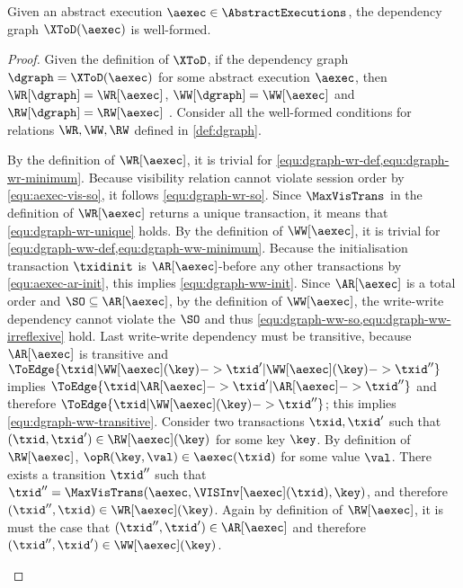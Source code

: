 \begin{toappendix}
\label{sec:proof-well-form-xtod}
\begin{proposition}
\label{prop:well-defined-xtod}
Given an abstract execution \( \aexec \in \AbstractExecutions \),
the dependency graph \( \XToD(\aexec)\) is well-formed.
\end{proposition}
\begin{proof}
Given the definition of \( \XToD \), if the dependency graph \( \dgraph = \XToD(\aexec)\) 
for some abstract execution \( \aexec \), then \( \WR[\dgraph] = \WR[\aexec] \),
\( \WW[\dgraph] = \WW[\aexec] \) and  \( \RW[\dgraph] = \RW[\aexec]\)  .
Consider all the well-formed conditions for relations \( \WR,\WW,\RW \) defined in \cref{def:dgraph}.
\begin{enumerate}
    By the definition of \( \WR[\aexec] \), it is trivial for \cref{equ:dgraph-wr-def,equ:dgraph-wr-minimum}.
    Because visibility relation cannot violate session order by \cref{equ:aexec-vis-so},
    it follows \cref{equ:dgraph-wr-so}.
    Since \(\MaxVisTrans \) in the definition of \( \WR[\aexec] \) returns a unique transaction, it means that \cref{equ:dgraph-wr-unique} holds.
    By the definition of \( \WW[\aexec] \), it is trivial for \cref{equ:dgraph-ww-def,equ:dgraph-ww-minimum}.
    Because the initialisation transaction \( \txidinit \)
    is \( \AR[\aexec]\)-before any other transactions by  \cref{equ:aexec-ar-init}, 
    this implies \cref{equ:dgraph-ww-init}.
    Since \(\AR[\aexec] \) is a total order and \( \SO \subseteq \AR[\aexec] \), 
    by the definition of \( \WW[\aexec]\), the write-write dependency cannot violate the \( \SO \) 
    and thus \cref{equ:dgraph-ww-so,equ:dgraph-ww-irreflexive} hold.
    Last write-write dependency must be transitive,
    because \( \AR[\aexec] \) is transitive and 
    \( \ToEdge{\txid | \WW[\aexec](\key) -> \txid' | \WW[\aexec](\key) -> \txid'' }\) implies
    \( \ToEdge{\txid | \AR[\aexec] -> \txid' | \AR[\aexec] -> \txid'' }\) and therefore
    \( \ToEdge{\txid | \WW[\aexec](\key) -> \txid'' }\);
    this implies \cref{equ:dgraph-ww-transitive}.
    Consider two transactions \( \txid, \txid'\) such that \( (\txid,\txid') \in \RW[\aexec](\key) \)
    for some key \( \key \).
    By definition of \( \RW[\aexec] \), \( \opR(\key,\val) \in \aexec(\txid )\) for some value \( \val \).
    There exists a transition \( \txid'' \) such that \( \txid'' = \MaxVisTrans(\aexec,\VISInv[\aexec](\txid),\key) \),
    and therefore \( (\txid'',\txid) \in \WR[\aexec](\key)\).
    Again by definition of \( \RW[\aexec] \), it is must the case that \( (\txid'',\txid') \in \AR[\aexec] \)
    and therefore \( (\txid'',\txid') \in \WW[\aexec](\key) \).


\end{enumerate}
\end{proof}
\end{toappendix}
